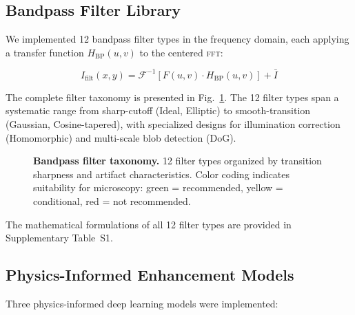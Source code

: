 \documentclass[11pt,a4paper]{article}
\newcommand{\fft}{\textsc{fft}\xspace}
\begin{document}
\subsection{Bandpass Filter Library}
\label{sec:filters}

We implemented 12 bandpass filter types in the frequency domain, each
applying a transfer function $H_{\text{BP}}(u,v)$ to the centered \fft:

\begin{equation}
    I_{\text{filt}}(x,y) = \mathcal{F}^{-1}\left[F(u,v) \cdot H_{\text{BP}}(u,v)\right] + \bar{I}
    \label{eq:filter}
\end{equation}

The complete filter taxonomy is presented in
Fig.~\ref{fig:filter_taxonomy}. The 12 filter types span a systematic
range from sharp-cutoff (Ideal, Elliptic) to smooth-transition (Gaussian,
Cosine-tapered), with specialized designs for illumination correction
(Homomorphic) and multi-scale blob detection (DoG).

\begin{figure}[H]
\centering

\caption{\textbf{Bandpass filter taxonomy.} 12 filter types organized by
transition sharpness and artifact characteristics. Color coding indicates
suitability for microscopy: green = recommended, yellow = conditional,
red = not recommended.}
\label{fig:filter_taxonomy}
\end{figure}

The mathematical formulations of all 12 filter types are provided in
Supplementary Table~S1.

\subsection{Physics-Informed Enhancement Models}
\label{sec:physics_models}

Three physics-informed deep learning models were implemented:
\end{document}
